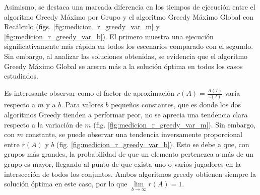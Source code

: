 Asimismo, se destaca una marcada diferencia en los tiempos de ejecución entre el algoritmo Greedy Máximo por Grupo y el algoritmo Greedy Máximo Global con Recálculo (figs. \ref{fig:medicion_r_greedy_var_m} y \ref{fig:medicion_r_greedy_var_b}). El primero muestra una ejecución significativamente más rápida en todos los escenarios comparado con el segundo. Sin embargo, al analizar las soluciones obtenidas, se evidencia que el algoritmo Greedy Máximo Global se acerca más a la solución óptima en todos los casos estudiados.

Es interesante observar como el factor de aproximación $r(A)=\frac{A(I)}{z(I)}$ varía respecto a $m$ y a $b$. Para valores $b$ pequeños constantes, que es donde los dos algorítmos Greedy tienden a performar peor, no se aprecia una tendencia clara respecto a la variación de $m$ (fig. \ref{fig:medicion_r_greedy_var_m}). Sin embargo, con $m$ constante, se puede observar una tendencia inversamente proporcional entre $r(A)$ y $b$ (fig. \ref{fig:medicion_r_greedy_var_b}). Esto se debe a que, con grupos más grandes, la probabilidad de que un elemento pertenezca a más de un grupo es mayor, llegando al punto de que exista uno o varios jugadores en la intersección de todos los conjuntos. Ambos algoritmos greedy obtienen siempre la solución óptima en este caso, por lo que $\lim\limits_{b \rightarrow \infty}r(A)=1$.

